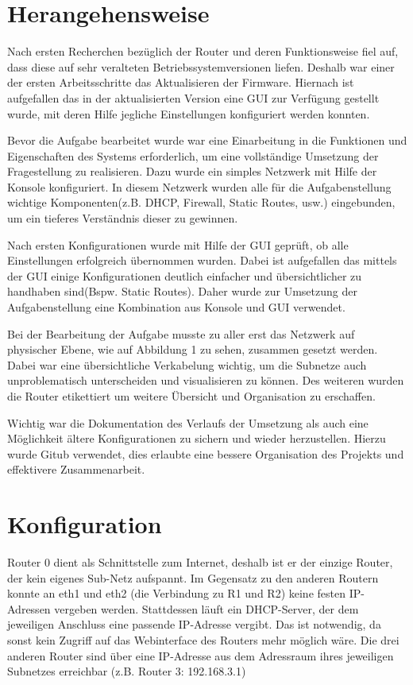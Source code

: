 \documentclass[10pt,a4paper]{article}
\begin{document}
\section{Herangehensweise}
Nach ersten Recherchen bezüglich der Router und deren
Funktionsweise fiel auf, dass diese auf sehr veralteten
Betriebssystemversionen liefen. Deshalb war einer der ersten
Arbeitsschritte das Aktualisieren der Firmware. Hiernach ist
aufgefallen das in der aktualisierten Version eine GUI zur
Verfügung gestellt wurde, mit deren Hilfe jegliche
Einstellungen konfiguriert werden konnten.
\par
Bevor die Aufgabe bearbeitet wurde war eine Einarbeitung in die
Funktionen und Eigenschaften des Systems erforderlich, um eine
vollständige Umsetzung der Fragestellung zu realisieren. Dazu wurde
ein simples Netzwerk mit Hilfe der Konsole konfiguriert. In diesem
Netzwerk wurden alle für die Aufgabenstellung wichtige
Komponenten(z.B. DHCP, Firewall, Static Routes, usw.) eingebunden, um
ein tieferes Verständnis dieser zu gewinnen.
\par
Nach ersten Konfigurationen wurde mit Hilfe der GUI geprüft, ob alle
Einstellungen erfolgreich übernommen wurden. Dabei ist aufgefallen das
mittels der GUI einige Konfigurationen deutlich einfacher und
übersichtlicher zu handhaben sind(Bspw. Static Routes). Daher wurde
zur Umsetzung der Aufgabenstellung eine Kombination aus Konsole und
GUI verwendet.
\par
Bei der Bearbeitung der Aufgabe musste zu aller erst das Netzwerk auf
physischer Ebene, wie auf Abbildung 1 zu sehen, zusammen gesetzt
werden. Dabei war eine übersichtliche Verkabelung wichtig, um die
Subnetze auch unproblematisch unterscheiden und visualisieren zu
können. Des weiteren wurden die Router etikettiert um weitere
Übersicht und Organisation zu erschaffen.
\par
Wichtig war die Dokumentation des Verlaufs der Umsetzung als auch eine
Möglichkeit ältere Konfigurationen zu sichern und wieder
herzustellen. Hierzu wurde Gitub verwendet, dies erlaubte eine bessere
Organisation des Projekts und effektivere Zusammenarbeit.


\section{Konfiguration}
	Router 0 dient als Schnittstelle zum Internet, deshalb ist er der einzige Router, der kein eigenes Sub-Netz aufspannt. Im Gegensatz zu den anderen Routern konnte an eth1 und eth2 (die Verbindung zu R1 und R2) keine festen IP-Adressen vergeben werden. Stattdessen läuft ein DHCP-Server, der dem jeweiligen Anschluss eine passende IP-Adresse vergibt. Das ist notwendig, da sonst kein Zugriff auf das Webinterface des Routers mehr möglich wäre. Die drei anderen Router sind über eine IP-Adresse aus dem Adressraum ihres jeweiligen Subnetzes erreichbar (z.B. Router 3: 192.168.3.1) \par
	
\end{document}
